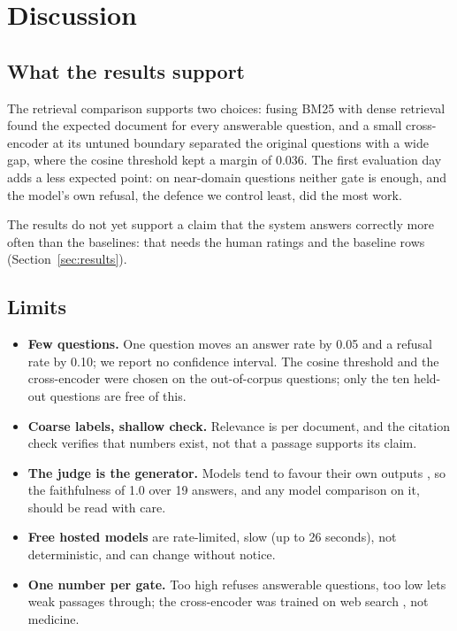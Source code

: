 \section{Discussion}
\label{sec:discussion}

\subsection{What the results support}

The retrieval comparison supports two choices: fusing BM25 with dense retrieval found the expected document for every answerable question, and a small cross-encoder at its untuned boundary separated the original questions with a wide gap, where the cosine threshold kept a margin of 0.036. The first evaluation day adds a less expected point: on near-domain questions neither gate is enough, and the model's own refusal, the defence we control least, did the most work.

The results do not yet support a claim that the system answers correctly more often than the baselines: that needs the human ratings and the baseline rows (Section~\ref{sec:results}).

\subsection{Limits}

\begin{itemize}
\item \textbf{Few questions.} One question moves an answer rate by 0.05 and a refusal rate by 0.10; we report no confidence interval. The cosine threshold and the cross-encoder were chosen on the out-of-corpus questions; only the ten held-out questions are free of this.
\item \textbf{Coarse labels, shallow check.} Relevance is per document, and the citation check verifies that numbers exist, not that a passage supports its claim.
\item \textbf{The judge is the generator.} Models tend to favour their own outputs \citep{zheng2023judge}, so the faithfulness of 1.0 over 19 answers, and any model comparison on it, should be read with care.
\item \textbf{Free hosted models} are rate-limited, slow (up to 26 seconds), not deterministic, and can change without notice.
\item \textbf{One number per gate.} Too high refuses answerable questions, too low lets weak passages through; the cross-encoder was trained on web search \citep{bajaj2016msmarco}, not medicine.
\end{itemize}

